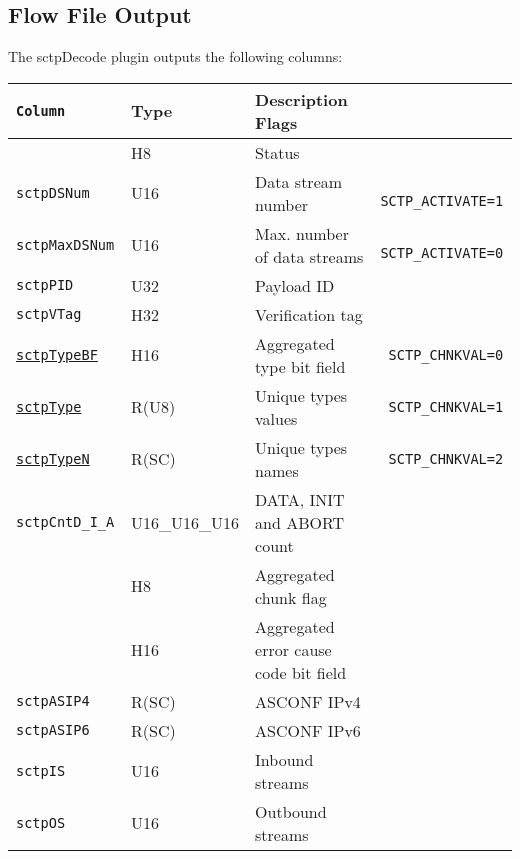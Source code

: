 \documentclass[documentation]{subfiles}
\begin{document}
\subsection{Flow File Output}
The sctpDecode plugin outputs the following columns:
\begin{longtable}{>{\tt}lll>{\tt\small}l}
    \toprule
    {\bf Column}                    & {\bf Type}    & {\bf Description}                           {\bf Flags}\\
    \midrule\endhead%
    \nameref{sctpStat}              & H8            & Status                                      & \\
    sctpDSNum                       & U16           & Data stream number                          & SCTP\_ACTIVATE=1\\
    sctpMaxDSNum                    & U16           & Max. number of data streams                 & SCTP\_ACTIVATE=0\\
    sctpPID                         & U32           & Payload ID                                  & \\
    sctpVTag                        & H32           & Verification tag                            & \\
    \hyperref[sctpType]{sctpTypeBF} & H16           & Aggregated type bit field                   & SCTP\_CHNKVAL=0\\
    \hyperref[sctpType]{sctpType}   & R(U8)         & Unique types values                         & SCTP\_CHNKVAL=1\\
    \hyperref[sctpType]{sctpTypeN}  & R(SC)         & Unique types names                          & SCTP\_CHNKVAL=2\\
    sctpCntD\_I\_A                  & U16\_U16\_U16 & DATA, INIT and ABORT count                  & \\
    \nameref{sctpCFlags}            & H8            & Aggregated chunk flag                       & \\
    \nameref{sctpCCBF}              & H16           & Aggregated error cause code bit field       & \\
    sctpASIP4                       & R(SC)         & ASCONF IPv4                                 & \\
    sctpASIP6                       & R(SC)         & ASCONF IPv6                                 & \\
    sctpIS                          & U16           & Inbound streams                             & \\
    sctpOS                          & U16           & Outbound streams                            & \\

\end{longtable}
\end{document}
